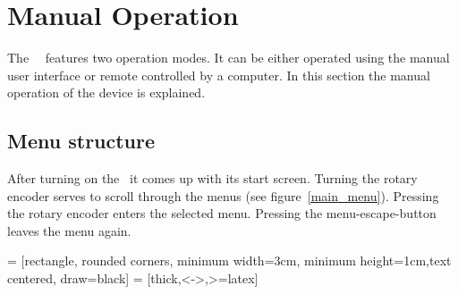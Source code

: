 \section{Manual Operation}
The \productNumber ~\productName ~features two operation modes. It can be either operated using the manual user interface or remote controlled by a computer. In this section the manual operation of the device is explained.
\subsection{Menu structure}
After turning on the \productName ~it comes up with its start screen. Turning the rotary encoder serves to scroll through the menus (see figure~\ref{main_menu}). Pressing the rotary encoder enters the selected menu. Pressing the menu-escape-button leaves the menu again.

 = [rectangle, rounded corners, minimum width=3cm, minimum height=1cm,text centered, draw=black]
 = [thick,<->,>=latex]
\def \textWidth {7cm}

